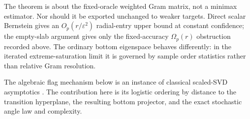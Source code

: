 \documentclass[11pt]{article}
\begin{document}
The theorem is about the fixed-oracle weighted Gram matrix, not a minimax estimator.  Nor should it be exported
unchanged to weaker targets.  Direct scalar Bernstein gives an $O_p(r/\varepsilon^2)$ radial-entry upper bound at
constant confidence; the empty-slab argument gives only the fixed-accuracy $\Omega_p(r)$ obstruction recorded
above.  The ordinary bottom eigenspace behaves differently: in the iterated extreme-saturation limit it is governed
by sample order statistics rather than relative Gram resolution.

The algebraic flag mechanism below is an instance of classical scaled-SVD asymptotics
\cite{stewart1984}.  The contribution here is its logistic ordering by distance to the transition hyperplane, the
resulting bottom projector, and the exact stochastic angle law and complexity.
\end{document}
